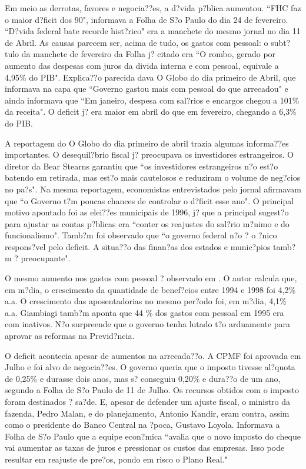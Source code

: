 \documentclass{article}
\begin{document}
Em meio as derrotas, favores e negocia??es, a d?vida p?blica aumentou. ``FHC faz o maior d?ficit dos 90", informava a Folha de S?o Paulo do dia 24 de fevereiro. ``D?vida federal bate recorde hist?rico" era a manchete do mesmo jornal no dia 11 de Abril. As causas parecem ser, acima de tudo, os gastos com pessoal: o subt?tulo da manchete de fevereiro da Folha j? citado era ``O rombo, gerado por aumento das despesas com juros da divida interna e com pessoal, equivale a 4,95\% do PIB". Explica??o parecida dava O Globo do dia primeiro de Abril, que informava na capa que ``Governo gastou mais com pessoal do que arrecadou" e ainda informava que ``Em janeiro, despesa com sal?rios e encargos chegou a 101\% da receita". O deficit j? era maior em abril do que em fevereiro, chegando a 6,3\% do PIB.

A reportagem do O Globo do dia primeiro de abril trazia algumas informa??es importantes. O desequil?brio fiscal j? preocupava os investidores estrangeiros. O diretor da Bear Stearns garantiu que ``os investidores estrangeiros n?o est?o batendo em retirada, mas est?o mais cautelosos e reduziram o volume de neg?cios no pa?s". Na mesma reportagem, economistas entrevistados pelo jornal afirmavam que ``o Governo t?m poucas chances de controlar o d?ficit esse ano". O principal motivo apontado foi as elei??es municipais de 1996, j? que a principal sugest?o para ajustar as contas p?blicas era ``conter os reajustes do sal?rio m?nimo e do funcionalismo". Tamb?m foi observado que ``o governo federal n?o ? o ?nico respons?vel pelo deficit. A situa??o das finan?as dos estados e munic?pios tamb?m ? preocupante".  

O mesmo aumento nos gastos com pessoal ? observado em \citet{Giambiagi2002}. O autor calcula que, em m?dia, o crescimento da quantidade de benef?cios entre 1994 e 1998 foi 4,2\% a.a. O crescimento das aposentadorias no mesmo per?odo foi, em m?dia, 4,1\% a.a. Giambiagi tamb?m aponta que 44 \% dos gastos com pessoal em 1995 era com inativos. N?o surpreende que o governo tenha lutado t?o arduamente para aprovar as reformas na Previd?ncia.   

O deficit acontecia apesar de aumentos na arrecada??o. A CPMF foi aprovada em Julho e foi alvo de negocia??es. O governo queria que o imposto tivesse al?quota de 0,25\% e durasse dois anos, mas s? conseguiu 0,20\% e dura??o de um ano, segundo a Folha de S?o Paulo de 11 de Julho. Os recursos obtidos com o imposto foram destinados ? sa?de. E, apesar de defender um ajuste fiscal, o ministro da fazenda, Pedro Malan, e do planejamento, Antonio Kandir, eram contra, assim como o presidente do Banco Central na ?poca, Gustavo Loyola. Informava a Folha de S?o Paulo que a equipe econ?mica ``avalia que o novo imposto do cheque vai aumentar as taxas de juros e pressionar os custos das empresas. Isso pode resultar em reajuste de pre?os, pondo em risco o Plano Real."
\end{document}
